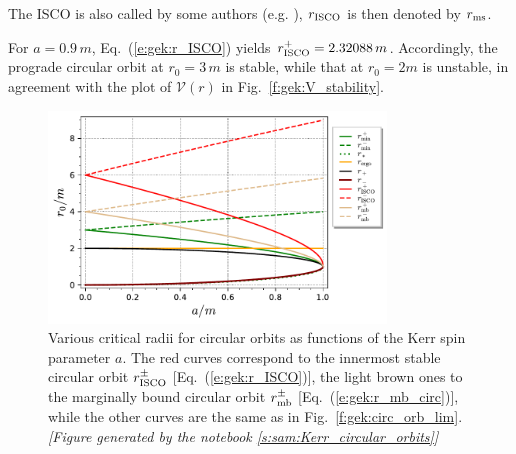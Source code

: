 \begin{remark}
The ISCO is also called  by some authors (e.g. \cite{BardePT72}), $r_{\rm ISCO}$ is then denoted by $r_{\rm ms}$.
\end{remark}

\begin{example}
For $a = 0.9\, m$, Eq.~(\ref{e:gek:r_ISCO}) yields $r_{\rm ISCO}^+ = 2.32088\, m$. Accordingly,
the prograde circular orbit at $r_0 = 3\, m$ is stable, while that at $r_0 = 2 m$ is unstable,
in agreement with the plot of $\mathcal{V}(r)$ in Fig.~\ref{f:gek:V_stability}.
\end{example}

\begin{figure}
\centerline{\includegraphics[width=0.8\textwidth]{gek_circ_orb_isco.pdf}}
\caption[]{\label{f:gek:circ_orb_isco} \footnotesize
Various critical radii for circular orbits as functions of the Kerr spin parameter $a$.
The red curves correspond to the innermost stable circular orbit $r_{\rm ISCO}^\pm$ [Eq.~(\ref{e:gek:r_ISCO})], the light brown ones to the marginally bound circular orbit
$r_{\rm mb}^\pm$ [Eq.~(\ref{e:gek:r_mb_circ})],
while the other curves are the same as in Fig.~\ref{f:gek:circ_orb_lim}.
\textsl{[Figure generated by the notebook \ref{s:sam:Kerr_circular_orbits}]}
}
\end{figure}

